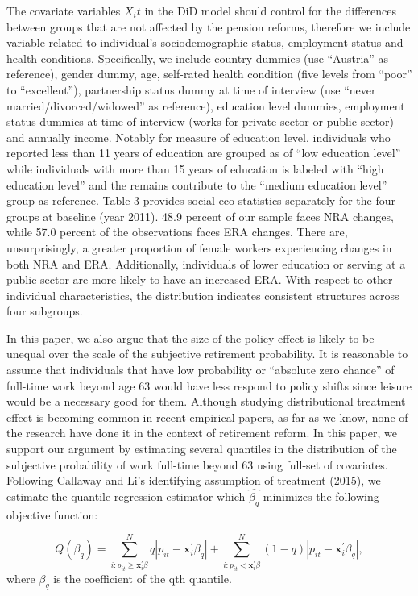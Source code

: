 \documentclass[a4paper]{article}
\begin{document}
The covariate variables $X_it$ in the DiD model should control for the differences between groups that are not affected by the pension reforms, therefore we include variable related to individual’s sociodemographic status, employment status and health conditions. Specifically, we include country dummies (use “Austria” as reference), gender dummy, age, self-rated health condition (five levels from “poor” to “excellent”), partnership status dummy at time of interview (use “never married/divorced/widowed” as reference), education level dummies, employment status dummies at time of interview (works for private sector or public sector) and annually income. Notably for measure of education level, individuals who reported less than 11 years of education are grouped as of “low education level” while individuals with more than 15 years of education is labeled with “high education level” and the remains contribute to the “medium education level” group as reference. Table 3 provides social-eco statistics separately for the four groups at baseline (year 2011). 48.9 percent of our sample faces NRA changes, while 57.0 percent of the observations faces ERA changes. There are, unsurprisingly, a greater proportion of female workers experiencing changes in both NRA and ERA. Additionally, individuals of lower education or serving at a public sector are more likely to have an increased ERA. With respect to other individual characteristics, the distribution indicates consistent structures across four subgroups. 

In this paper, we also argue that the size of the policy effect is likely to be unequal over the scale of the subjective retirement probability. It is reasonable to assume that individuals that have low probability or “absolute zero chance” of full-time work beyond age 63 would have less respond to policy shifts since leisure would be a necessary good for them. Although studying distributional treatment effect is becoming common in recent empirical papers, as far as we know, none of the research have done it in the context of retirement reform. In this paper, we support our argument by estimating several quantiles in the distribution of the subjective probability of work full-time beyond 63 using full-set of covariates. Following Callaway and Li’s identifying assumption of treatment (2015), we estimate the quantile regression estimator which $\hat{\beta_q}$ minimizes the following objective function:
 
\begin{equation}
Q\left(\beta_{q}\right)=\sum_{i : p_{i t} \geq \boldsymbol{x}^{'}_{i} \beta}^{N} q\left|p_{i t}-\boldsymbol{x}^{'}_{i} \beta_{q}\right|+\sum_{i : p_{i t}<\boldsymbol{x}^{'}_{i} \beta}^{N}(1-q)\left|p_{i t}-\boldsymbol{x}^{'}_{i} \beta_{q}\right|,
\end{equation}
where $ \beta_q$ is the coefficient of the qth quantile.
\end{document}
